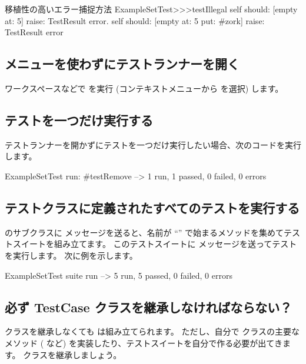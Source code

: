 \documentclass[a4paper,10pt,twoside]{book}
\begin{document}
\begin{method}[portabletestillegal]{移植性の高いエラー捕捉方法}
ExampleSetTest>>>testIllegal
	self should: [empty at: 5] raise: TestResult error.
	self should: [empty at: 5 put: #zork] raise: TestResult error
\end{method}


\subsection{メニューを使わずにテストランナーを開く}

ワークスペースなどで  を実行 (コンテキストメニューから  を選択) します。


\subsection{テストを一つだけ実行する}

テストランナーを開かずにテストを一つだけ実行したい場合、次のコードを実行します。

\begin{code}{}
ExampleSetTest run: #testRemove --> 1 run, 1 passed, 0 failed, 0 errors
\end{code}

\subsection{テストクラスに定義されたすべてのテストを実行する}

 のサブクラスに  メッセージを送ると、名前が ``'' で始まるメソッドを集めてテストスイートを組み立てます。
このテストスイートに  メッセージを送ってテストを実行します。
次に例を示します。

\begin{code}{}
ExampleSetTest suite run --> 5 run, 5 passed, 0 failed, 0 errors
\end{code}

\subsection{必ず TestCase クラスを継承しなければならない？}

 クラスを継承しなくても  は組み立てられます。
ただし、自分で  クラスの主要なメソッド ( など) を実装したり、テストスイートを自分で作る必要が出てきます。
 クラスを継承しましょう。
\end{document}
